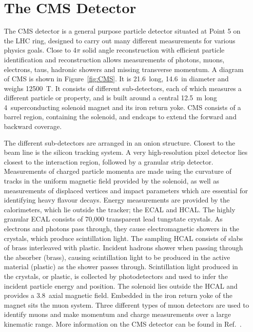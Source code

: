 \section{The CMS Detector}
\label{sec:CMS}

The \ac{CMS} detector is a general purpose particle detector situated at Point 5 on the \ac{LHC} ring, designed to carry out many different measurements for various physics goals.
Close to 4$\pi$ solid angle reconstruction with 
efficient particle identification and reconstruction allows measurements of photons, muons, electrons, taus, hadronic showers and missing transverse momentum.
%
A diagram of \ac{CMS} is shown in Figure~\ref{fig:CMS}. It is 21.6~\m long, 14.6~\m in diameter and weighs 12500~T. 
It consists of different sub-detectors, each of which measures a different particle or property, 
and is built around a central 12.5~m long 4~\T superconducting solenoid magnet and its iron return yoke.
%
\ac{CMS} consists of a barrel region, containing the solenoid, and endcaps to extend the forward and backward coverage.

%
The different sub-detectors are arranged in an onion structure.
%
Closest to the beam line is the silicon tracking system.
A very high-resolution pixel detector lies closest to the interaction region, followed by a granular strip detector.
Measurements of charged particle momenta are made using the curvature of tracks in the uniform magnetic field provided by the solenoid, as well as measurements of displaced vertices and impact parameters which are essential for identifying heavy flavour decays. 
%
Energy measurements are provided by the calorimeters, which lie outside the tracker; the \ac{ECAL} and \ac{HCAL}. 
The highly granular \ac{ECAL} consists of 70,000 transparent lead tungstate crystals. 
As electrons and photons pass through, they cause electromagnetic showers in the crystals, which produce scintillation light.
%
The sampling \ac{HCAL} consists of slabs of brass interleaved with plastic. 
Incident hadrons shower when passing through the absorber (brass), causing scintillation light to be produced in the active material (plastic) as the shower passes through.
%
Scintillation light produced in the crystals, or plastic, is collected by photodetectors and used to infer the incident particle energy and position.
%
The solenoid lies outside the \ac{HCAL} and provides a 3.8~\T axial magnetic field.
%
Embedded in the iron return yoke of the magnet sits the muon system. 
Three different types of muon detectors are used to identify muons and make momentum and charge measurements over a large kinematic range.
%
More information on the CMS detector can be found in Ref.~\cite{Chatrchyan:2008zzk}.


